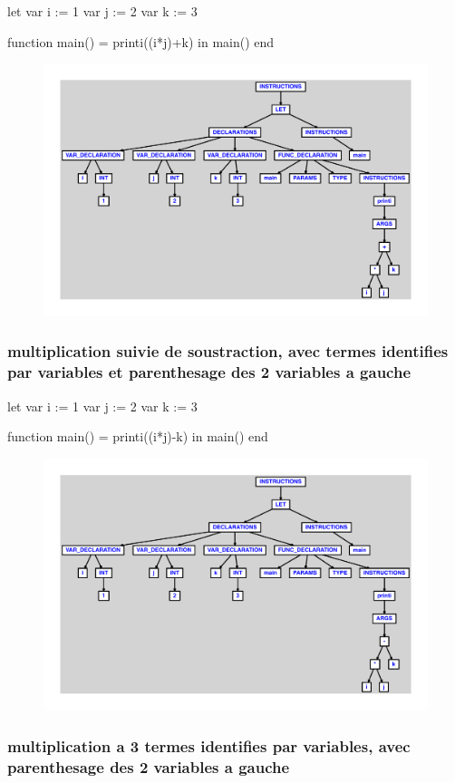 \documentclass{article}
\begin{document}
\begin{verbatimtab}
let
	var i := 1
	var j := 2
	var k := 3

	function main() = printi((i*j)+k)
in main() end
\end{verbatimtab}
\begin{figure}[H]\centering\includegraphics[max width=\textwidth]{ast/ast_123.pdf}\end{figure}\subsubsection{multiplication suivie de soustraction, avec termes identifies par variables et parenthesage des 2 variables a gauche}
\begin{verbatimtab}
let
	var i := 1
	var j := 2
	var k := 3

	function main() = printi((i*j)-k)
in main() end
\end{verbatimtab}
\begin{figure}[H]\centering\includegraphics[max width=\textwidth]{ast/ast_124.pdf}\end{figure}\subsubsection{multiplication a 3 termes identifies par variables, avec parenthesage des 2 variables a gauche}
\end{document}
